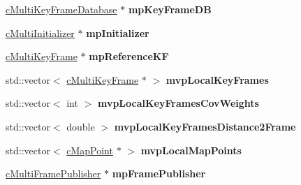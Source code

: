 \begin{DoxyCompactItemize}
\item 
\hyperlink{classMultiColSLAM_1_1cMultiKeyFrameDatabase}{c\+Multi\+Key\+Frame\+Database} $\ast$ {\bfseries mp\+Key\+Frame\+DB}\hypertarget{classMultiColSLAM_1_1cTracking_a5643064d75e65f7adb525e6698dd0a46}{}\label{classMultiColSLAM_1_1cTracking_a5643064d75e65f7adb525e6698dd0a46}

\item 
\hyperlink{classMultiColSLAM_1_1cMultiInitializer}{c\+Multi\+Initializer} $\ast$ {\bfseries mp\+Initializer}\hypertarget{classMultiColSLAM_1_1cTracking_a4fccd05b92e2c3ca93e20b5394185c5d}{}\label{classMultiColSLAM_1_1cTracking_a4fccd05b92e2c3ca93e20b5394185c5d}

\item 
\hyperlink{classMultiColSLAM_1_1cMultiKeyFrame}{c\+Multi\+Key\+Frame} $\ast$ {\bfseries mp\+Reference\+KF}\hypertarget{classMultiColSLAM_1_1cTracking_a035eaea4efc760a2ebdda592a5666e8f}{}\label{classMultiColSLAM_1_1cTracking_a035eaea4efc760a2ebdda592a5666e8f}

\item 
std\+::vector$<$ \hyperlink{classMultiColSLAM_1_1cMultiKeyFrame}{c\+Multi\+Key\+Frame} $\ast$ $>$ {\bfseries mvp\+Local\+Key\+Frames}\hypertarget{classMultiColSLAM_1_1cTracking_a3d9d929a0f993280520b9d1dff7ad5e8}{}\label{classMultiColSLAM_1_1cTracking_a3d9d929a0f993280520b9d1dff7ad5e8}

\item 
std\+::vector$<$ int $>$ {\bfseries mvp\+Local\+Key\+Frames\+Cov\+Weights}\hypertarget{classMultiColSLAM_1_1cTracking_a65d7538700bb5bcae00d7bf209172c4a}{}\label{classMultiColSLAM_1_1cTracking_a65d7538700bb5bcae00d7bf209172c4a}

\item 
std\+::vector$<$ double $>$ {\bfseries mvp\+Local\+Key\+Frames\+Distance2\+Frame}\hypertarget{classMultiColSLAM_1_1cTracking_acaa333324cc84a3bb1297b96dc9965af}{}\label{classMultiColSLAM_1_1cTracking_acaa333324cc84a3bb1297b96dc9965af}

\item 
std\+::vector$<$ \hyperlink{classMultiColSLAM_1_1cMapPoint}{c\+Map\+Point} $\ast$ $>$ {\bfseries mvp\+Local\+Map\+Points}\hypertarget{classMultiColSLAM_1_1cTracking_a4d3a7d86ece70934ef1144eab56c1e69}{}\label{classMultiColSLAM_1_1cTracking_a4d3a7d86ece70934ef1144eab56c1e69}

\item 
\hyperlink{classMultiColSLAM_1_1cMultiFramePublisher}{c\+Multi\+Frame\+Publisher} $\ast$ {\bfseries mp\+Frame\+Publisher}\hypertarget{classMultiColSLAM_1_1cTracking_abe9d95db143745a6b12663c7fe5e8ee1}{}\label{classMultiColSLAM_1_1cTracking_abe9d95db143745a6b12663c7fe5e8ee1}


\end{DoxyCompactItemize}
